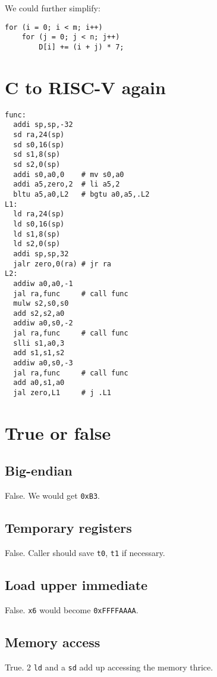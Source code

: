 \documentclass[12pt, a4paper]{article}
\begin{document}
We could further simplify:

\begin{verbatim}
for (i = 0; i < m; i++)
    for (j = 0; j < n; j++)
        D[i] += (i + j) * 7;
\end{verbatim}

\section{C to RISC-V again}

\begin{verbatim}
func:
  addi sp,sp,-32
  sd ra,24(sp)
  sd s0,16(sp)
  sd s1,8(sp)
  sd s2,0(sp)
  addi s0,a0,0    # mv s0,a0
  addi a5,zero,2  # li a5,2
  bltu a5,a0,L2   # bgtu a0,a5,.L2
L1:
  ld ra,24(sp)
  ld s0,16(sp)
  ld s1,8(sp)
  ld s2,0(sp)
  addi sp,sp,32
  jalr zero,0(ra) # jr ra
L2:
  addiw a0,a0,-1
  jal ra,func     # call func
  mulw s2,s0,s0
  add s2,s2,a0
  addiw a0,s0,-2
  jal ra,func     # call func
  slli s1,a0,3
  add s1,s1,s2
  addiw a0,s0,-3
  jal ra,func     # call func
  add a0,s1,a0
  jal zero,L1     # j .L1
\end{verbatim}

\section{True or false}

\subsection{Big-endian}

False. We would get \texttt{0xB3}.

\subsection{Temporary registers}

False. Caller should save \texttt{t0}, \texttt{t1} if necessary.

\subsection{Load upper immediate}

False. \texttt{x6} would become \texttt{0xFFFFAAAA}.

\subsection{Memory access}

True. 2 \texttt{ld} and a \texttt{sd} add up accessing the memory thrice.
\end{document}
